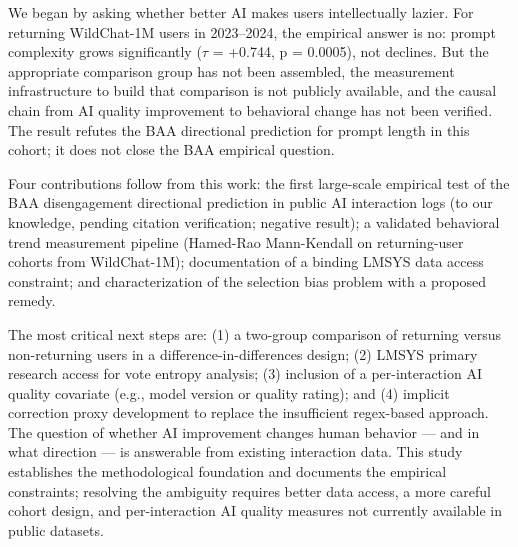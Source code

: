
We began by asking whether better AI makes users intellectually lazier. For returning WildChat-1M users in 2023--2024, the empirical answer is no: prompt complexity grows significantly ($\tau$ = +0.744, p = 0.0005), not declines. But the appropriate comparison group has not been assembled, the measurement infrastructure to build that comparison is not publicly available, and the causal chain from AI quality improvement to behavioral change has not been verified. The result refutes the BAA directional prediction for prompt length in this cohort; it does not close the BAA empirical question.

Four contributions follow from this work: the first large-scale empirical test of the BAA disengagement directional prediction in public AI interaction logs (to our knowledge, pending citation verification; negative result); a validated behavioral trend measurement pipeline (Hamed-Rao Mann-Kendall on returning-user cohorts from WildChat-1M); documentation of a binding LMSYS data access constraint; and characterization of the selection bias problem with a proposed remedy.

The most critical next steps are: (1) a two-group comparison of returning versus non-returning users in a difference-in-differences design; (2) LMSYS primary research access for vote entropy analysis; (3) inclusion of a per-interaction AI quality covariate (e.g., model version or quality rating); and (4) implicit correction proxy development to replace the insufficient regex-based approach. The question of whether AI improvement changes human behavior --- and in what direction --- is answerable from existing interaction data. This study establishes the methodological foundation and documents the empirical constraints; resolving the ambiguity requires better data access, a more careful cohort design, and per-interaction AI quality measures not currently available in public datasets.

